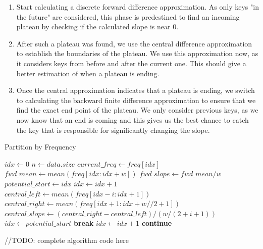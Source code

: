 \begin{enumerate}
    \item Start calculating a discrete forward difference approximation. As only keys "in the future" are considered, this phase is predestined to find an incoming plateau by checking if the calculated slope is near 0.
    \item After such a plateau was found, we use the central difference approximation to establish the boundaries of the plateau. We use this approximation now, as it considers keys from before and after the current one. This should give a better estimation of when a plateau is ending.
    \item Once the central approximation indicates that a plateau is ending, we switch to calculating the backward finite difference approximation to ensure that we find the exact end point of the plateau. We only consider previous keys, as we now know that an end is coming and this gives us the best chance to catch the key that is responsible for significantly changing the slope.
\end{enumerate}



\begin{algorithm}
\caption{Partition by Frequency}
\begin{algorithmic} 
    \STATE $idx \leftarrow 0$
    \STATE $n \leftarrow data.size$
    \STATE $current\_freq \leftarrow freq[idx]$
    \STATE $fwd\_mean \leftarrow mean(freq[idx : idx + w])$
    \STATE $fwd\_slope \leftarrow fwd\_mean / w$
    \STATE $potential\_start \leftarrow idx$
    \STATE $idx \leftarrow idx + 1$
    \STATE $central\_left \leftarrow mean(freq[idx - i : idx + 1])$
    \STATE $central\_right \leftarrow mean(freq[idx + 1 : idx + w // 2 + 1])$
    \STATE $central\_slope \leftarrow (central\_right - central\_left) / (w / (2 + i + 1))$
    \STATE $idx \leftarrow potential\_start$
    \STATE\textbf{break}
    \ENDIF
    \ENDFOR
    \STATE $idx \leftarrow idx + 1$
    \STATE \textbf{continue}
    \ENDIF
    \ENDIF
    \ENDWHILE
    
\end{algorithmic}
\end{algorithm}

//TODO: complete algorithm code here

